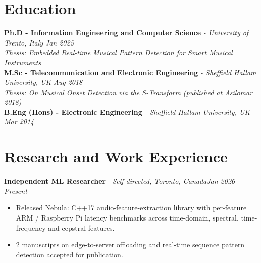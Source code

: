 \documentclass[11pt]{article}
\newenvironment{cvrole}[5]{%
  \par\noindent\textbf{\large #1} | \textit{\small #2, #3}\hfill \textit{\small #4 - #5}\par
  \begin{itemize}[leftmargin=2em, itemsep=-0.3em, topsep=-0.5em]%
}{%
  \end{itemize}\par\noindent\mbox{}\par\vspace{0.1em}%
}
\begin{document}
\section*{Education}
\textbf{Ph.D - Information Engineering and Computer Science} \textit{\small{ - University of Trento, Italy}} \hfill \textit{Jan 2025}\\[-1pt]
\noindent\textit{\small\hspace*{1.5em}Thesis: Embedded Real-time Musical Pattern Detection for Smart Musical Instruments}\\[3pt]
\noindent\textbf{M.Sc - Telecommunication and Electronic Engineering} \textit{\small{ - Sheffield Hallam University, UK}} \hfill \textit{Aug 2018}\\[-1pt]
\noindent\textit{\small\hspace*{1.5em}Thesis: On Musical Onset Detection via the S-Transform (published at Asilomar 2018)}\\[3pt]
\noindent\textbf{B.Eng (Hons) - Electronic Engineering} \textit{\small{ - Sheffield Hallam University, UK}} \hfill \textit{Mar 2014}

\section*{Research and Work Experience}

\begin{cvrole}{Independent ML Researcher}{Self-directed}{Toronto, Canada}{Jan 2026}{Present}
    \item Released Nebula: C++17 audio-feature-extraction library with per-feature ARM / Raspberry Pi latency benchmarks across time-domain, spectral, time-frequency and cepstral features.
    \item 2 manuscripts on edge-to-server offloading and real-time sequence pattern detection accepted for publication.
\end{cvrole}
\end{document}

